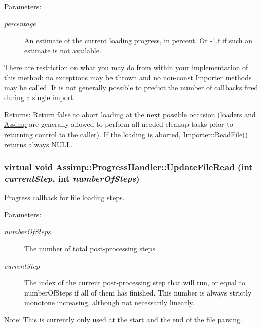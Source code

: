 \begin{Desc}
\item[Parameters:]
\begin{description}
\item[{\em percentage}]An estimate of the current loading progress, in percent. Or -1.f if such an estimate is not available.\end{description}
\end{Desc}
There are restriction on what you may do from within your implementation of this method: no exceptions may be thrown and no non-const Importer methods may be called. It is not generally possible to predict the number of callbacks fired during a single import.

\begin{Desc}
\item[Returns:]Return false to abort loading at the next possible occasion (loaders and \hyperlink{namespace_assimp}{Assimp} are generally allowed to perform all needed cleanup tasks prior to returning control to the caller). If the loading is aborted, Importer::ReadFile() returns always NULL. \end{Desc}
\hypertarget{class_assimp_1_1_progress_handler_0c867692ee9d1e25dec1e2f08fb5e20d}{
\subsubsection[UpdateFileRead]{\setlength{\rightskip}{0pt plus 5cm}virtual void Assimp::ProgressHandler::UpdateFileRead (int {\em currentStep}, \/  int {\em numberOfSteps})}}
\label{class_assimp_1_1_progress_handler_0c867692ee9d1e25dec1e2f08fb5e20d}


Progress callback for file loading steps. 

\begin{Desc}
\item[Parameters:]
\begin{description}
\item[{\em numberOfSteps}]The number of total post-processing steps \item[{\em currentStep}]The index of the current post-processing step that will run, or equal to numberOfSteps if all of them has finished. This number is always strictly monotone increasing, although not necessarily linearly.\end{description}
\end{Desc}
\begin{Desc}
\item[Note:]This is currently only used at the start and the end of the file parsing. \end{Desc}


